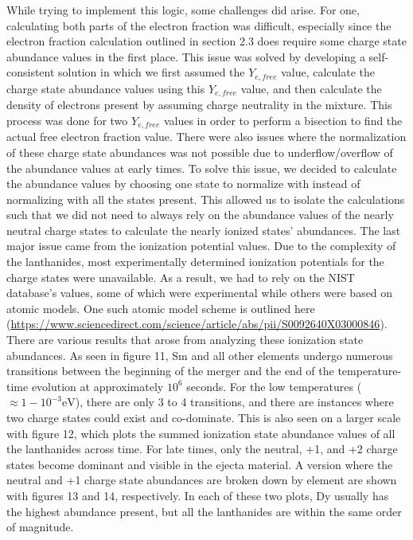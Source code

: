 \documentclass[11pt,a4paper]{article}
\begin{document}
\vspace{.5 cm}


While trying to implement this logic, some challenges did arise. For one, calculating both parts of the electron fraction was difficult, especially since the electron fraction calculation outlined in section 2.3 does require some charge state abundance values in the first place. This issue was solved by developing a self-consistent solution in which we first assumed the $Y_{e,free}$ value, calculate the charge state abundance values using this $Y_{e,free}$ value, and then calculate the density of electrons present by assuming charge neutrality in the mixture. This process was done for two $Y_{e,free}$ values in order to perform a bisection to find the actual free electron fraction value. There were also issues where the normalization of these charge state abundances was not possible due to underflow/overflow of the abundance values at early times. To solve this issue, we decided to calculate the abundance values by choosing one state to normalize with instead of normalizing with all the states present. This allowed us to isolate the calculations such that we did not need to always rely on the abundance values of the nearly neutral charge states to calculate the nearly ionized states' abundances. The last major issue came from the ionization potential values. Due to the complexity of the lanthanides, most experimentally determined ionization potentials for the charge states were unavailable. As a result, we had to rely on the NIST database's values, some of which were experimental while others were based on atomic models. One such atomic model scheme is outlined here (\url{https://www.sciencedirect.com/science/article/abs/pii/S0092640X03000846}).  \\

There are various results that arose from analyzing these ionization state abundances. As seen in figure 11, Sm and all other elements undergo numerous transitions between the beginning of the merger and the end of the temperature-time evolution at approximately $10^6$ seconds. For the low temperatures ($\approx 1 - 10^{-3} \mathrm{eV}$), there are only 3 to 4 transitions, and there are instances where two charge states could exist and co-dominate. This is also seen on a larger scale with figure 12, which plots the summed ionization state abundance values of all the lanthanides across time. For late times, only the neutral, +1, and +2 charge states become dominant and visible in the ejecta material. A version where the neutral and +1 charge state abundances are broken down by element are shown with figures 13 and 14, respectively. In each of these two plots, Dy usually has the highest abundance present, but all the lanthanides are within the same order of magnitude.
\end{document}

